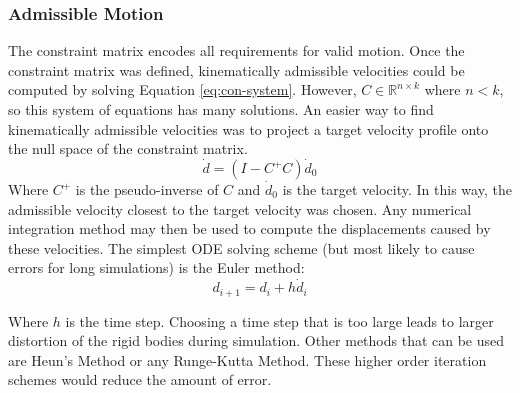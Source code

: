 \subsubsection{Admissible Motion}
The constraint matrix encodes all requirements for valid motion. Once the constraint matrix was defined, kinematically admissible velocities could be computed by solving Equation \ref{eq:con-system}. However, $C \in \mathbb{R}^{n \times k}$  where $n < k $, so this system of equations has many solutions. An easier way to find kinematically admissible velocities was to project a target velocity profile onto the null space of the constraint matrix.
\begin{equation}\label{eq:null-space}
\dot d = (I-C^{+}C)\dot d_0
\end{equation}
Where $C^+$ is the pseudo-inverse of $C$ and $\dot d_0$ is the target velocity.
In this way, the admissible velocity closest to the target velocity was chosen. Any numerical integration method may then be used to compute the displacements caused by these velocities. The simplest ODE solving scheme (but most likely to cause errors for long simulations) is the Euler method:
$$d_{i+1}=d_{i}+h\dot d_{i}$$

Where $h$ is the time step. Choosing a time step that is too large leads to larger distortion of the rigid bodies during simulation. Other methods that can be used are Heun's Method or any Runge-Kutta Method. These higher order iteration schemes would reduce the amount of error.


